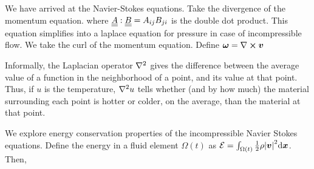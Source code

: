 We have arrived at the Navier-Stokes equations.
Take the divergence of the momentum equation.
where $\underline{\underline{A}}:\underline{\underline{B}}=A_{ij}B_{ji}$ is the double dot product. This equation simplifies into a laplace equation for pressure in case of incompressible flow.
We take the curl of the momentum equation. Define $\boldsymbol{\omega}=\nabla\cross\boldsymbol{v}$


Informally, the Laplacian operator $\nabla^2$ gives the difference between the average value of a function in the neighborhood of a point, and its value at that point. Thus, if $u$ is the temperature, $\nabla^2 u$ tells whether (and by how much) the material surrounding each point is hotter or colder, on the average, than the material at that point.

We explore energy conservation properties of the incompressible Navier Stokes equations. Define the energy in a fluid element $\Omega(t)$ as $\mathcal{E}=\int_{\Omega(t)}\frac{1}{2}\rho\abs{\boldsymbol{v}}^2\mathrm{d}\boldsymbol{x}$. Then,


